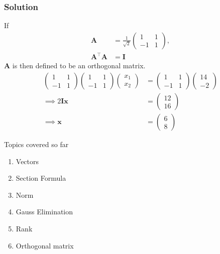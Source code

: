 \documentclass{beamer}
\theoremstyle{remark}
\newcommand{\myvec}[1]{\ensuremath{\begin{pmatrix}#1\end{pmatrix}}}
\let\vec\mathbf
\begin{document}
%
\begin{frame}
\frametitle{Solution}
If
    \begin{align}
	    \vec{A}&=\frac{1}{\sqrt{2}}\myvec{
        1 & 1\\
        -1 & 1
    },\\
	    \vec{A}^\top \vec{A}&= \vec{I}    
    \end{align}
$\vec{A}$ is then defined to be an orthogonal matrix.
    \begin{align}
            \myvec{
        1 & 1\\
        -1 & 1
    }
    \myvec{
        1 & 1\\
        -1 & 1
    }
    \myvec{
        x_1\\
        x_2
    } &= 
    \myvec{
        1 & 1\\
        -1 & 1
    }
    \myvec{
        14\\
        -2
    } \\
\implies    2\vec{I}\vec{x} &= \myvec{
        12\\
        16
    }\\
    \implies \vec{x} &= \myvec{
        6\\
        8
    }
\end{align}
\end{frame}
%
%
\begin{frame}{Topics covered so far}
    \begin{enumerate}
        \item {Vectors}
        \item {Section Formula}
        \item {Norm}
        \item {Gauss Elimination}
        \item {Rank}
        \item {Orthogonal matrix}
    \end{enumerate}
\end{frame}
%
\end{document}
